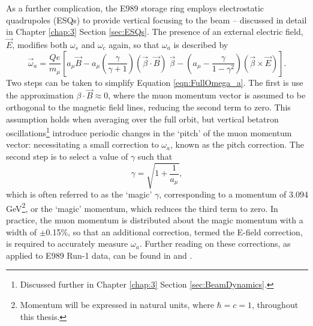 As a further complication, the E989 storage ring employs electrostatic quadrupoles (ESQs) to provide vertical focusing to the beam -- discussed in detail in Chapter \ref{chap:3} Section \ref{sec:ESQs}. The presence of an external electric field, $\vec{E}$, modifies both $\omega_{s}$ and $\omega_{c}$ again, so that $\omega_{a}$ is described by
%
%
\begin{equation}
  \vec{\omega}_{a}=\frac{Qe}{m_{\mu}} \left[ a_{\mu}\vec{B}-a_{\mu}\left(\frac{\gamma}{\gamma+1}\right)(\vec{\beta}\cdot\vec{B})\;\vec{\beta}-\left(a_{\mu}-\frac{\gamma}{1-\gamma^{2}}\right) (\vec{\beta} \times \vec{E}) \right]. %
  \label{eqn:FullOmega_a}
\end{equation}
%
Two steps can be taken to simplify Equation \ref{eqn:FullOmega_a}. The first is use the approximation $\beta\cdot\vec{B}\approx0$, where the muon momentum vector is assumed to be orthogonal to the magnetic field lines, reducing the second term to zero. This assumption holds when averaging over the full orbit, but vertical betatron oscillations\footnote{Discussed further in Chapter \ref{chap:3} Section \ref{sec:BeamDynamics}.} introduce periodic changes in the `pitch' of the muon momentum vector: necessitating a small correction to $\omega_{a}$, known as the pitch correction. The second step is to select a value of $\gamma$ such that
%
\begin{equation}
  \gamma=\sqrt{1+\frac{1}{a_{\mu}}},
  \label{eqn:MagicGamma}
\end{equation}
%
which is often referred to as the `magic' $\gamma$, corresponding to a momentum of 3.094 GeV\footnote{Momentum will be expressed in natural units, where $\hbar=c=1$, throughout this thesis.}, or the `magic' momentum, which reduces the third term to zero. In practice, the muon momentum is distributed about the magic momentum with a width of $\pm$0.15\%, so that an additional correction, termed the E-field correction, is required to accurately measure $\omega_{a}$. Further reading on these corrections, as applied to E989 Run-1 data, can be found in \cite{OmegaARun1} and \cite{BeamDynamics}.

